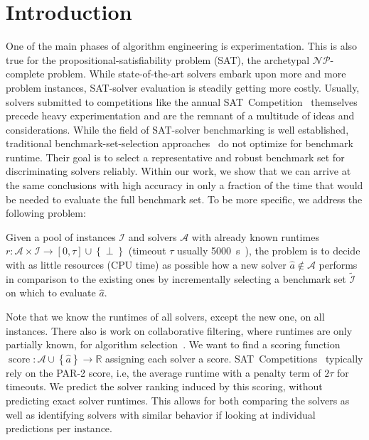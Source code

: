 \documentclass[runningheads]{llncs}
\begin{document}
\section{Introduction}
\label{sec:intro}
One of the main phases of algorithm engineering is experimentation.
This is also true for the pro\-po\-si\-tio\-nal-sat\-is\-fia\-bi\-li\-ty problem (SAT), the archetypal $\mathcal{NP}$-complete problem.
While state-of-the-art solvers embark upon more and more problem instances, SAT-solver evaluation is steadily getting more costly.
Usually, solvers submitted to competitions like the annual SAT~Competition~\cite{FroleyksHIJS21,sat2022} themselves precede heavy experimentation and are the remnant of a multitude of ideas and considerations.
While the field of SAT-solver benchmarking is well established, traditional benchmark-set-selection approaches~\cite{Gelder11,HoosKSS13} do not optimize for benchmark runtime.
Their goal is to select a representative and robust benchmark set for discriminating solvers reliably.
Within our work, we show that we can arrive at the same conclusions with high accuracy in only a fraction of the time that would be needed to evaluate the full benchmark set.
To be more specific, we address the following problem:

\begin{definition}
	Given a pool of instances $\mathcal{I}$ and solvers $\mathcal{A}$ with already known runtimes $r\!: \mathcal{A} \times \mathcal{I} \rightarrow \left[0, \tau\right] \cup \left\lbrace \perp \right\rbrace$ (timeout $\tau$ usually \SI{5000}{s}~\cite{FroleyksHIJS21}), the problem is to decide with as little resources (CPU time) as possible how a new solver $\hat{a} \notin \mathcal{A}$ performs in comparison to the existing ones by incrementally selecting a benchmark set $\tilde{\mathcal{I}}$ on which to evaluate $\hat{a}$.
	\label{def:new-solver-problem}
\end{definition}

Note that we know the runtimes of all solvers, except the new one, on all instances.
There also is work on collaborative filtering, where runtimes are only partially known, for algorithm selection~\cite{misir2017alors,misir2017data}.
We want to find a scoring function $\operatorname{score}\!: \mathcal{A} \cup \left\lbrace \hat{a} \right\rbrace \rightarrow \mathbb{R}$ assigning each solver a score.
SAT~Competitions~\cite{FroleyksHIJS21} typically rely on the PAR-2 score, i.e, the average runtime with a penalty term of $2\tau$ for timeouts.
We predict the solver ranking induced by this scoring, without predicting exact solver runtimes.
This allows for both comparing the solvers as well as identifying solvers with similar behavior if looking at individual predictions per instance.
\end{document}
